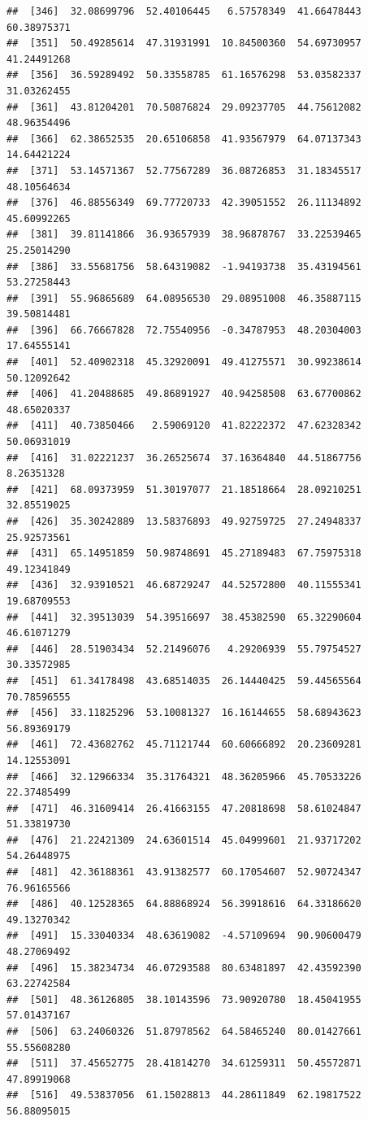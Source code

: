 \documentclass[
]{article}
\begin{document}
\begin{verbatim}
##  [346]  32.08699796  52.40106445   6.57578349  41.66478443  60.38975371
##  [351]  50.49285614  47.31931991  10.84500360  54.69730957  41.24491268
##  [356]  36.59289492  50.33558785  61.16576298  53.03582337  31.03262455
##  [361]  43.81204201  70.50876824  29.09237705  44.75612082  48.96354496
##  [366]  62.38652535  20.65106858  41.93567979  64.07137343  14.64421224
##  [371]  53.14571367  52.77567289  36.08726853  31.18345517  48.10564634
##  [376]  46.88556349  69.77720733  42.39051552  26.11134892  45.60992265
##  [381]  39.81141866  36.93657939  38.96878767  33.22539465  25.25014290
##  [386]  33.55681756  58.64319082  -1.94193738  35.43194561  53.27258443
##  [391]  55.96865689  64.08956530  29.08951008  46.35887115  39.50814481
##  [396]  66.76667828  72.75540956  -0.34787953  48.20304003  17.64555141
##  [401]  52.40902318  45.32920091  49.41275571  30.99238614  50.12092642
##  [406]  41.20488685  49.86891927  40.94258508  63.67700862  48.65020337
##  [411]  40.73850466   2.59069120  41.82222372  47.62328342  50.06931019
##  [416]  31.02221237  36.26525674  37.16364840  44.51867756   8.26351328
##  [421]  68.09373959  51.30197077  21.18518664  28.09210251  32.85519025
##  [426]  35.30242889  13.58376893  49.92759725  27.24948337  25.92573561
##  [431]  65.14951859  50.98748691  45.27189483  67.75975318  49.12341849
##  [436]  32.93910521  46.68729247  44.52572800  40.11555341  19.68709553
##  [441]  32.39513039  54.39516697  38.45382590  65.32290604  46.61071279
##  [446]  28.51903434  52.21496076   4.29206939  55.79754527  30.33572985
##  [451]  61.34178498  43.68514035  26.14440425  59.44565564  70.78596555
##  [456]  33.11825296  53.10081327  16.16144655  58.68943623  56.89369179
##  [461]  72.43682762  45.71121744  60.60666892  20.23609281  14.12553091
##  [466]  32.12966334  35.31764321  48.36205966  45.70533226  22.37485499
##  [471]  46.31609414  26.41663155  47.20818698  58.61024847  51.33819730
##  [476]  21.22421309  24.63601514  45.04999601  21.93717202  54.26448975
##  [481]  42.36188361  43.91382577  60.17054607  52.90724347  76.96165566
##  [486]  40.12528365  64.88868924  56.39918616  64.33186620  49.13270342
##  [491]  15.33040334  48.63619082  -4.57109694  90.90600479  48.27069492
##  [496]  15.38234734  46.07293588  80.63481897  42.43592390  63.22742584
##  [501]  48.36126805  38.10143596  73.90920780  18.45041955  57.01437167
##  [506]  63.24060326  51.87978562  64.58465240  80.01427661  55.55608280
##  [511]  37.45652775  28.41814270  34.61259311  50.45572871  47.89919068
##  [516]  49.53837056  61.15028813  44.28611849  62.19817522  56.88095015

\end{verbatim}
\end{document}
